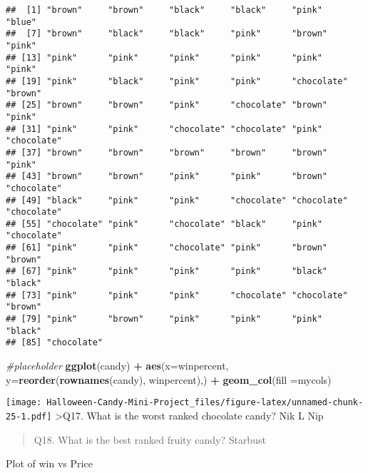 \documentclass[
]{article}
\newenvironment{Shaded}{\begin{snugshade}}{\end{snugshade}}
\newcommand{\AttributeTok}[1]{\textcolor[rgb]{0.13,0.29,0.53}{#1}}
\newcommand{\CommentTok}[1]{\textcolor[rgb]{0.56,0.35,0.01}{\textit{#1}}}
\newcommand{\FunctionTok}[1]{\textcolor[rgb]{0.13,0.29,0.53}{\textbf{#1}}}
\newcommand{\NormalTok}[1]{#1}
\newcommand{\OtherTok}[1]{\textcolor[rgb]{0.56,0.35,0.01}{#1}}
\newcommand{\SpecialCharTok}[1]{\textcolor[rgb]{0.81,0.36,0.00}{\textbf{#1}}}
\newcommand{\StringTok}[1]{\textcolor[rgb]{0.31,0.60,0.02}{#1}}
\begin{document}
\begin{verbatim}
##  [1] "brown"     "brown"     "black"     "black"     "pink"      "blue"     
##  [7] "brown"     "black"     "black"     "pink"      "brown"     "pink"     
## [13] "pink"      "pink"      "pink"      "pink"      "pink"      "pink"     
## [19] "pink"      "black"     "pink"      "pink"      "chocolate" "brown"    
## [25] "brown"     "brown"     "pink"      "chocolate" "brown"     "pink"     
## [31] "pink"      "pink"      "chocolate" "chocolate" "pink"      "chocolate"
## [37] "brown"     "brown"     "brown"     "brown"     "brown"     "pink"     
## [43] "brown"     "brown"     "pink"      "pink"      "brown"     "chocolate"
## [49] "black"     "pink"      "pink"      "chocolate" "chocolate" "chocolate"
## [55] "chocolate" "pink"      "chocolate" "black"     "pink"      "chocolate"
## [61] "pink"      "pink"      "chocolate" "pink"      "brown"     "brown"    
## [67] "pink"      "pink"      "pink"      "pink"      "black"     "black"    
## [73] "pink"      "pink"      "pink"      "chocolate" "chocolate" "brown"    
## [79] "pink"      "brown"     "pink"      "pink"      "pink"      "black"    
## [85] "chocolate"
\end{verbatim}

\begin{Shaded}
\begin{Highlighting}[]
\CommentTok{\#placeholder}
\FunctionTok{ggplot}\NormalTok{(candy) }\SpecialCharTok{+}
  \FunctionTok{aes}\NormalTok{(}\AttributeTok{x=}\NormalTok{winpercent, }
      \AttributeTok{y=}\FunctionTok{reorder}\NormalTok{(}\FunctionTok{rownames}\NormalTok{(candy), winpercent),) }\SpecialCharTok{+}
  \FunctionTok{geom\_col}\NormalTok{(}\AttributeTok{fill =}\NormalTok{mycols)}
\end{Highlighting}
\end{Shaded}

\texttt{[image: Halloween-Candy-Mini-Project\_files/figure-latex/unnamed-chunk-25-1.pdf]}
\textgreater Q17. What is the worst ranked chocolate candy? Nik L Nip

\begin{quote}
Q18. What is the best ranked fruity candy? Starbust
\end{quote}

Plot of win vs Price

\begin{Shaded}
\end{Shaded}
\end{document}
